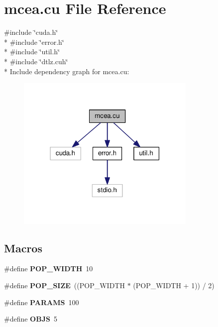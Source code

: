 \hypertarget{mcea_8cu}{}\section{mcea.\+cu File Reference}
\label{mcea_8cu}
{\ttfamily \#include \char`\"{}cuda.\+h\char`\"{}}\\*
{\ttfamily \#include \char`\"{}error.\+h\char`\"{}}\\*
{\ttfamily \#include \char`\"{}util.\+h\char`\"{}}\\*
{\ttfamily \#include \char`\"{}dtlz.\+cuh\char`\"{}}\\*
Include dependency graph for mcea.\+cu\+:\nopagebreak
\begin{figure}[H]
\begin{center}
\leavevmode
\includegraphics[width=244pt]{mcea_8cu__incl}
\end{center}
\end{figure}
\subsection*{Macros}
\begin{DoxyCompactItemize}
\item 
\#define {\bfseries P\+O\+P\+\_\+\+W\+I\+D\+TH}~10\hypertarget{mcea_8cu_a078505a45e5598fe76de40d43e70e48a}{}\label{mcea_8cu_a078505a45e5598fe76de40d43e70e48a}

\item 
\#define {\bfseries P\+O\+P\+\_\+\+S\+I\+ZE}~((P\+O\+P\+\_\+\+W\+I\+D\+TH $\ast$ (P\+O\+P\+\_\+\+W\+I\+D\+TH + 1)) / 2)\hypertarget{mcea_8cu_aea5b3e4c9df97408e95b67cdf3f992fb}{}\label{mcea_8cu_aea5b3e4c9df97408e95b67cdf3f992fb}

\item 
\#define {\bfseries P\+A\+R\+A\+MS}~100\hypertarget{mcea_8cu_ab0b1e59d96396ba9dca2147f9feb44eb}{}\label{mcea_8cu_ab0b1e59d96396ba9dca2147f9feb44eb}

\item 
\#define {\bfseries O\+B\+JS}~5\hypertarget{mcea_8cu_ad15e0f6530352f2b65cb6147c597c61b}{}\label{mcea_8cu_ad15e0f6530352f2b65cb6147c597c61b}

\end{DoxyCompactItemize}

